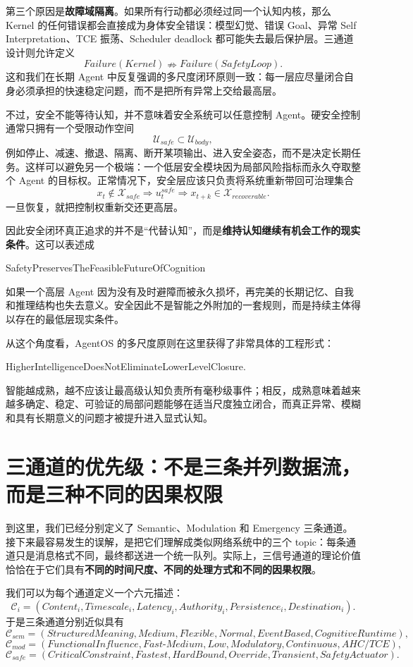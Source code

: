 第三个原因是\textbf{故障域隔离}。如果所有行动都必须经过同一个认知内核，那么 Kernel 的任何错误都会直接成为身体安全错误：模型幻觉、错误 Goal、异常 Self Interpretation、TCE 振荡、Scheduler deadlock 都可能失去最后保护层。三通道设计则允许定义
\[
Failure(Kernel)
\nRightarrow
Failure(SafetyLoop).
\]
这和我们在长期 Agent 中反复强调的多尺度闭环原则一致：每一层应尽量闭合自身必须承担的快速稳定问题，而不是把所有异常上交给最高层。

不过，安全不能等待认知，并不意味着安全系统可以任意控制 Agent。硬安全控制通常只拥有一个受限动作空间
\[
\mathcal U_{safe}
\subset
\mathcal U_{body},
\]
例如停止、减速、撤退、隔离、断开某项输出、进入安全姿态，而不是决定长期任务。这样可以避免另一个极端：一个低层安全模块因为局部风险指标而永久夺取整个 Agent 的目标权。正常情况下，安全层应该只负责将系统重新带回可治理集合
\[
x_t\notin\mathcal X_{safe}
\Rightarrow
u_t^{safe}
\Rightarrow
x_{t+k}\in\mathcal X_{recoverable}.
\]
一旦恢复，就把控制权重新交还更高层。

因此安全闭环真正追求的并不是“代替认知”，而是\textbf{维持认知继续有机会工作的现实条件}。这可以表述成
\begin{statementbox}
SafetyPreservesTheFeasibleFutureOfCognition
\end{statementbox}
如果一个高层 Agent 因为没有及时避障而被永久损坏，再完美的长期记忆、自我和推理结构也失去意义。安全因此不是智能之外附加的一套规则，而是持续主体得以存在的最低层现实条件。

从这个角度看，AgentOS 的多尺度原则在这里获得了非常具体的工程形式：
\begin{statementbox}
HigherIntelligenceDoesNotEliminateLowerLevelClosure.
\end{statementbox}
智能越成熟，越不应该让最高级认知负责所有毫秒级事件；相反，成熟意味着越来越多确定、稳定、可验证的局部问题能够在适当尺度独立闭合，而真正异常、模糊和具有长期意义的问题才被提升进入显式认知。

\section{三通道的优先级：不是三条并列数据流，而是三种不同的因果权限}
\label{sec:channel-priority}

到这里，我们已经分别定义了 Semantic、Modulation 和 Emergency 三条通道。接下来最容易发生的误解，是把它们理解成类似网络系统中的三个 topic：每条通道只是消息格式不同，最终都送进一个统一队列。实际上，三信号通道的理论价值恰恰在于它们具有\textbf{不同的时间尺度、不同的处理方式和不同的因果权限}。

我们可以为每个通道定义一个六元描述：
\[
\mathcal C_i
=
(
Content_i,
Timescale_i,
Latency_i,
Authority_i,
Persistence_i,
Destination_i
).
\]
于是三条通道分别近似具有
\[
\mathcal C_{sem}
=
(
StructuredMeaning,
Medium,
Flexible,
Normal,
EventBased,
CognitiveRuntime
),
\]
\[
\mathcal C_{mod}
=
(
FunctionalInfluence,
Fast\mbox{-}Medium,
Low,
Modulatory,
Continuous,
AHC/TCE
),
\]
\[
\mathcal C_{safe}
=
(
CriticalConstraint,
Fastest,
HardBound,
Override,
Transient,
SafetyActuator
).
\]


